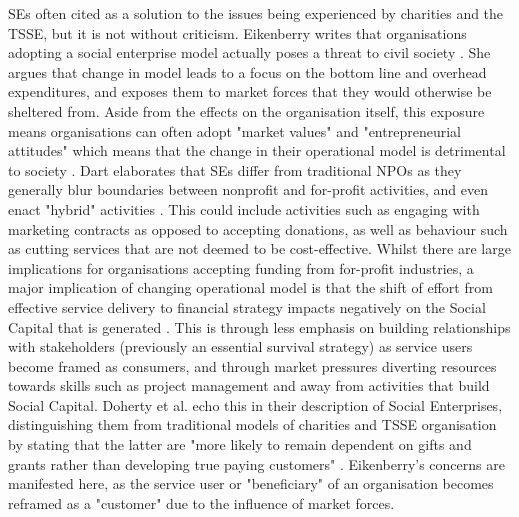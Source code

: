 SEs often cited as a solution to the issues being experienced by charities and the TSSE, but it is not without criticism. Eikenberry writes that organisations adopting a social enterprise model actually poses a threat to civil society \cite{eikenberry_marketization_2004}. She argues that change in model leads to a focus on the bottom line and overhead expenditures, and exposes them to market forces that they would otherwise be sheltered from. Aside from the effects on the organisation itself, this exposure means organisations can often adopt "market values" and "entrepreneurial attitudes" which means that the change in their operational model is detrimental to society \cite{eikenberry_marketization_2004}. Dart elaborates that SEs differ from traditional NPOs as they generally blur boundaries between nonprofit and for-profit activities, and even enact "hybrid" activities \cite{dart_legitimacy_2004}. This could include activities such as engaging with marketing contracts as opposed to accepting donations, as well as behaviour such as cutting services that are not deemed to be cost-effective. Whilst there are large implications for organisations accepting funding from for-profit industries, a major implication of changing operational model is that the shift of effort from effective service delivery to financial strategy impacts negatively on the Social Capital that is generated \cite{eikenberry_marketization_2004}. This is through less emphasis on building relationships with stakeholders (previously an essential survival strategy) as service users become framed as consumers, and through market pressures diverting resources towards skills such as project management and away from activities that build Social Capital. Doherty et al. echo this in their description of Social Enterprises, distinguishing them from traditional models of charities and TSSE organisation by stating that the latter are "more likely to remain dependent on gifts and grants rather than developing true paying customers" \cite{doherty_diverse_2006}. Eikenberry's concerns are manifested here, as the service user or "beneficiary" of an organisation becomes reframed as a "customer" due to the influence of market forces.

